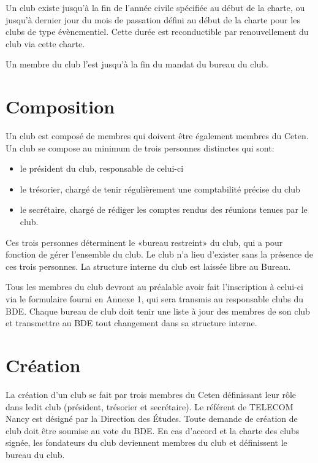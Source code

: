 \documentclass{article} %
\begin{document}
\begin{multicols}{2}
{			Un club existe jusqu’à la fin de l’année civile spécifiée au début
			de la charte, ou jusqu’à dernier jour du mois de passation défini au
			début de la charte pour les clubs de type évènementiel. Cette durée
			est reconductible par renouvellement du club via cette charte.

			Un membre du club l’est jusqu’à la fin du mandat du bureau du club.
			
		}

		\section{Composition}
		
		{\small
		
			Un club est composé de membres qui doivent être également membres du
			Ceten. Un club se compose au minimum de trois personnes distinctes
			qui sont:
			\begin{itemize}
				\item le président du club, responsable de celui-ci
				\item le trésorier, chargé de tenir régulièrement une
					comptabilité précise du club
				\item le secrétaire, chargé de rédiger les comptes rendus des 
					réunions tenues par le club.
			\end{itemize}
			Ces trois personnes déterminent le «bureau restreint» du club, qui a
			pour fonction de gérer l’ensemble du club. Le club n’a lieu
			d’exister sans la présence de ces trois personnes. La structure
			interne du club est laissée libre au Bureau.

			Tous les membres du club devront au préalable avoir fait
			l’inscription à celui-ci via le formulaire fourni en Annexe 1, qui
			sera transmis au responsable clubs du BDE\@.
			Chaque bureau de club doit tenir une liste à jour des membres de son
			club et transmettre au BDE tout changement dans sa structure
			interne.
			
		}
		
		\section{Création}
		
		{\small
		
			La création d’un club se fait par trois membres du Ceten définissant
			leur rôle dans ledit club (président, trésorier et secrétaire). Le
			référent de TELECOM Nancy est désigné par la Direction des Études.
			Toute demande de création de club doit être soumise au vote du BDE\@.
			En cas d’accord et la charte des clubs signée, les fondateurs du
			club deviennent membres du club et définissent le bureau du club.
			
}
\end{multicols}
\end{document}
